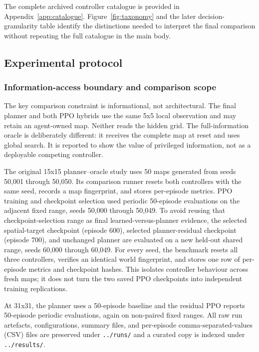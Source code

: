 \documentclass[10pt,letterpaper]{article}
\begin{document}
The complete archived controller catalogue is provided in Appendix~\ref{app:catalogue}. Figure~\ref{fig:taxonomy} and the later decision-granularity table identify the distinctions needed to interpret the final comparison without repeating the full catalogue in the main body.

\subsection{Experimental protocol}

\subsubsection{Information-access boundary and comparison scope}

The key comparison constraint is informational, not architectural. The final planner and both PPO hybrids use the same 5x5 local observation and may retain an agent-owned map. Neither reads the hidden grid. The full-information oracle is deliberately different: it receives the complete map at reset and uses global search. It is reported to show the value of privileged information, not as a deployable competing controller.

The original 15x15 planner--oracle study uses 50 maps generated from seeds 50,001 through 50,050. Its comparison runner resets both controllers with the same seed, records a map fingerprint, and stores per-episode metrics. PPO training and checkpoint selection used periodic 50-episode evaluations on the adjacent fixed range, seeds 50,000 through 50,049. To avoid reusing that checkpoint-selection range as final learned-versus-planner evidence, the selected spatial-target checkpoint (episode 600), selected planner-residual checkpoint (episode 700), and unchanged planner are evaluated on a new held-out shared range, seeds 60,000 through 60,049. For every seed, the benchmark resets all three controllers, verifies an identical world fingerprint, and stores one row of per-episode metrics and checkpoint hashes. This isolates controller behaviour across fresh maps; it does not turn the two saved PPO checkpoints into independent training replications.

At 31x31, the planner uses a 50-episode baseline and the residual PPO reports 50-episode periodic evaluations, again on non-paired fixed ranges. All raw run artefacts, configurations, summary files, and per-episode comma-separated-values (CSV) files are preserved under \texttt{../runs/} and a curated copy is indexed under \texttt{../results/}.
\end{document}
